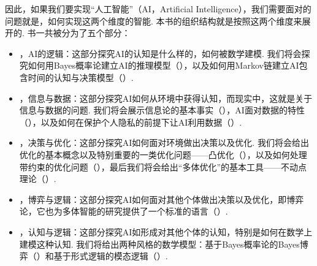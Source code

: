 因此，如果我们要实现“人工智能”（AI，Artificial Intelligence），我们需要面对的问题就是，如何实现这两个维度的智能. 本书的组织结构就是按照这两个维度来展开的. 书一共被分为了五个部分：
\begin{itemize}
    \item {}，AI的逻辑：这部分探究AI的认知是什么样的，如何被数学建模. 我们将会探究如何用Bayes概率论建立AI的推理模型（），以及如何用Markov链建立AI包含时间的认知与决策模型（）. 
    \item  {}，信息与数据：这部分探究AI如何从环境中获得认知，而现实中，这就是关于信息与数据的问题. 我们将会展示信息论的基本事实（），AI面对数据的特性（），以及如何在保护个人隐私的前提下让AI利用数据（）. 
    \item  {}，决策与优化：这部分探究AI如何面对环境做出决策以及优化. 我们将会给出优化的基本概念以及特别重要的一类优化问题——凸优化（），以及如何处理带约束的优化问题（），最后我们将会给出“多体优化”的基本工具——不动点理论（）. 
    \item  {}，博弈与逻辑：这部分探究AI如何面对其他个体做出决策以及优化，即博弈论，它也为多体智能的研究提供了一个标准的语言（）. 
    \item  {}，认知与逻辑：这部分探究AI如形成对其他个体的认知，特别是如何在数学上建模这种认知. 我们将给出两种风格的数学模型：基于Bayes概率论的Bayes博弈（）和基于形式逻辑的模态逻辑（）. 
\end{itemize}


